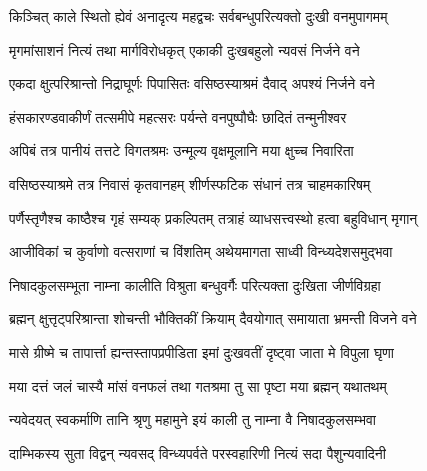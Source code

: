 \twolineshloka
{किञ्चित् काले स्थितो ह्येवं अनादृत्य महद्वचः}
{सर्वबन्धुपरित्यक्तो दुःखी वनमुपागमम्}%

 

\twolineshloka
{मृगमांसाशनं नित्यं तथा मार्गविरोधकृत्}
{एकाकी दुःखबहुलो न्यवसं निर्जने वने}%

 

\twolineshloka
{एकदा क्षुत्परिश्रान्तो निद्राघूर्णः पिपासितः}
{वसिष्ठस्याश्रमं दैवाद् अपश्यं निर्जने वने}%

 

\twolineshloka
{हंसकारण्डवाकीर्णं तत्समीपे महत्सरः}
{पर्यन्ते वनपुष्पौघैः छादितं तन्मुनीश्वर}%

 

\twolineshloka
{अपिबं तत्र पानीयं तत्तटे विगतश्रमः}
{उन्मूल्य वृक्षमूलानि मया क्षुच्च निवारिता}%

 

\twolineshloka
{वसिष्ठस्याश्रमे तत्र निवासं कृतवानहम्}
{शीर्णस्फटिक संधानं तत्र चाहमकारिषम्}%

 

\twolineshloka
{पर्णैस्तृणैश्च काष्ठैश्च गृहं सम्यक् प्रकल्पितम्}
{तत्राहं व्याधसत्त्वस्थो हत्वा बहुविधान् मृगान्}%

 

\twolineshloka
{आजीविकां च कुर्वाणो वत्सराणां च विंशतिम्}
{अथेयमागता साध्वी विन्ध्यदेशसमुद्‌भवा}%

 

\twolineshloka
{निषादकुलसम्भूता नाम्ना कालीति विश्रुता}
{बन्धुवर्गैः परित्यक्ता दुःखिता जीर्णविग्रहा}%

 

\twolineshloka
{ब्रह्मन् क्षुत्तृट्परिश्रान्ता शोचन्ती भौक्तिकीं क्रियाम्}
{दैवयोगात् समायाता भ्रमन्ती विजने वने}%

 

\twolineshloka
{मासे ग्रीष्मे च तापार्त्ता ह्यन्तस्तापप्रपीडिता}
{इमां दुःखवतीं दृष्ट्वा जाता मे विपुला घृणा}%

 

\twolineshloka
{मया दत्तं जलं चास्यै मांसं वनफलं तथा}
{गतश्रमा तु सा पृष्टा मया ब्रह्मन् यथातथम्}%

 

\twolineshloka
{न्यवेदयत् स्वकर्माणि तानि श्रृणु महामुने}
{इयं काली तु नाम्ना वै निषादकुलसम्भवा}%

 

\twolineshloka
{दाम्भिकस्य सुता विद्वन् न्यवसद् विन्ध्यपर्वते}
{परस्वहारिणी नित्यं सदा पैशुन्यवादिनी}%

